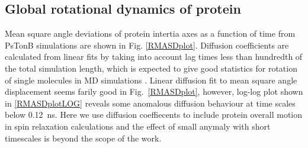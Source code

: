 \documentclass[pre,aps,floatfix,authordate1-4,twocolumn]{revtex4-1}
\begin{document}
\subsection{Global rotational dynamics of protein}
Mean square angle deviations of protein intertia axes as a function of time
from PsTonB simulations are shown in Fig. \ref{RMASDplot}.
Diffusion coefficients are calculated from linear fits by taking into
account lag times less than hundredth of the total simulation length,
which is expected to give good statistics for rotation of single molecules
in MD simulations \cite{??}. Linear diffusion fit to mean square angle
displacement seems farily good in Fig.~\ref{RMASDplot}, however,
log-log plot shown in \ref{RMASDplotLOG} reveals some anomalous
diffusion behaviour at time scales below 0.12~ns. Here we use diffusion
coeffiecents to include protein overall motion in spin relaxation
calculations and the effect of small anymaly with short timescales
is beyond the scope of the work. 
\end{document}
